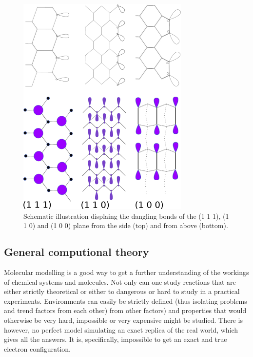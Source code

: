 \documentclass[10pt,a4paper]{article}
\begin{document}
\begin{figure} \captionsetup{width=.5\linewidth} \caption{Schematic illustration displaing the dangling bonds of the (1 1 1), (1 1 0) and (1 0 0) plane from the side (top) and from above (bottom).} \label{dangling_bonds}
\includegraphics[width=.5\linewidth]{pictures/dangling_bonds.png}
\end{figure} 

\subsection{General computional theory}
Molecular modelling is a good way to get a further understanding of the workings of chemical systems and molecules.  Not only can one study reactions that are either strictly theoretical or either to dangerous or hard to study in a practical experiments. Environments can easily be strictly defined (thus isolating problems and trend factors from each other) from other factors) and properties that would otherwise be very hard, impossible or very expensive might be studied. There is however, no perfect model simulating an exact replica of the real world, which gives all the answers. It is, specifically, impossible to get an exact and true electron configuration.
\end{document}
